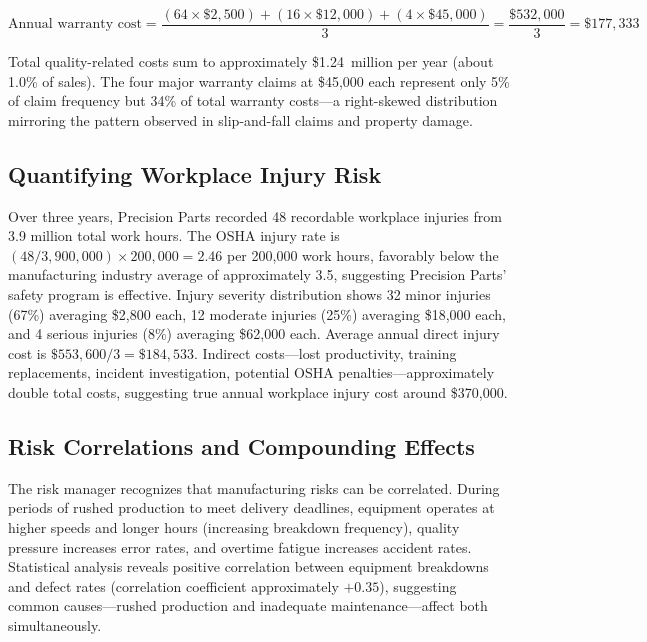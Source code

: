 \documentclass[11pt,openany]{book}
\begin{document}
\[
  \text{Annual warranty cost}
  = \frac{(64 \times \$2{,}500) + (16 \times \$12{,}000) + (4 \times \$45{,}000)}{3}
  = \frac{\$532{,}000}{3}
  = \$177{,}333
\]

Total quality-related costs sum to approximately \$1.24~million per year
(about 1.0\% of sales). The four major warranty claims at \$45,000 each
represent only 5\% of claim frequency but 34\% of total warranty costs---a
right-skewed distribution mirroring the pattern observed in slip-and-fall claims
and property damage.

\subsection{Quantifying Workplace Injury Risk}
\label{subsec:precision-injuries}

Over three years, Precision Parts recorded 48 recordable workplace injuries
from 3.9 million total work hours. The OSHA injury rate is
\((48 / 3{,}900{,}000) \times 200{,}000 = 2.46\) per 200,000 work hours,
favorably below the manufacturing industry average of approximately 3.5,
suggesting Precision Parts' safety program is effective. Injury severity
distribution shows 32 minor injuries (67\%) averaging \$2,800 each, 12
moderate injuries (25\%) averaging \$18,000 each, and 4 serious injuries (8\%)
averaging \$62,000 each. Average annual direct injury cost is
\(\$553{,}600 / 3 = \$184{,}533\). Indirect costs---lost productivity, training
replacements, incident investigation, potential OSHA penalties---approximately
double total costs, suggesting true annual workplace injury cost around
\$370,000.

\subsection{Risk Correlations and Compounding Effects}
\label{subsec:precision-correlations}

The risk manager recognizes that manufacturing risks can be correlated. During
periods of rushed production to meet delivery deadlines, equipment operates at
higher speeds and longer hours (increasing breakdown frequency), quality
pressure increases error rates, and overtime fatigue increases accident rates.
Statistical analysis reveals positive correlation between equipment breakdowns
and defect rates (correlation coefficient approximately \(+0.35\)), suggesting
common causes---rushed production and inadequate maintenance---affect both
simultaneously.
\end{document}

